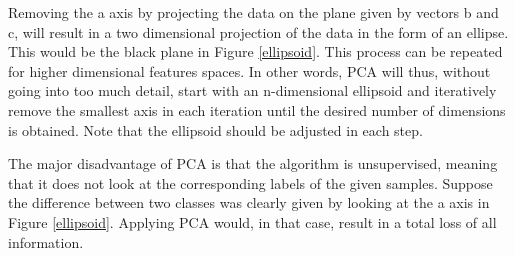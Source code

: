 
Removing the a axis by projecting the data on the plane given by vectors b and c, will result in a two dimensional projection of the data in the form of an ellipse. This would be the black plane in Figure \ref{ellipsoid}. This process can be repeated for higher dimensional features spaces. In other words, PCA will thus, without going into too much detail, start with an n-dimensional ellipsoid and iteratively remove the smallest axis in each iteration until the desired number of dimensions is obtained. Note that the ellipsoid should be adjusted in each step.

\npar

The major disadvantage of PCA is that the algorithm is unsupervised, meaning that it does not look at the corresponding labels of the given samples. Suppose the difference between two classes was clearly given by looking at the a axis in Figure \ref{ellipsoid}. Applying PCA would, in that case, result in a total loss of all information.